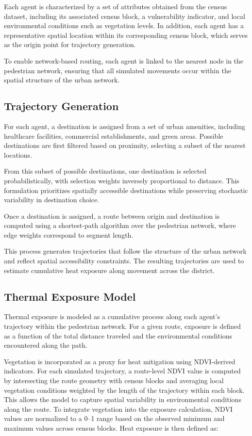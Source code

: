 \documentclass{wscpaperproc}
\theoremstyle{wsc}
\begin{document}
Each agent is characterized by a set of attributes obtained from the census dataset, including its associated census block, a vulnerability indicator, and local environmental conditions such as vegetation levels. In addition, each agent has a representative spatial location within its corresponding census block, which serves as the origin point for trajectory generation.

To enable network-based routing, each agent is linked to the nearest node in the pedestrian network, ensuring that all simulated movements occur within the spatial structure of the urban network.

\subsection{Trajectory Generation}

For each agent, a destination is assigned from a set of urban amenities, including healthcare facilities, commercial establishments, and green areas. Possible destinations are first filtered based on proximity, selecting a subset of the nearest locations.

From this subset of possible destinations, one destination is selected probabilistically, with selection weights inversely proportional to distance. This formulation prioritizes spatially accessible destinations while preserving stochastic variability in destination choice.

Once a destination is assigned, a route between origin and destination is computed using a shortest-path algorithm over the pedestrian network, where edge weights correspond to segment length.

This process generates trajectories that follow the structure of the urban network and reflect spatial accessibility constraints. The resulting trajectories are used to estimate cumulative heat exposure along movement across the district.


\subsection{Thermal Exposure Model}

Thermal exposure is modeled as a cumulative process along each agent's trajectory within the pedestrian network. For a given route, exposure is defined as a function of the total distance traveled and the environmental conditions encountered along the path.

Vegetation is incorporated as a proxy for heat mitigation using NDVI-derived indicators. For each simulated trajectory, a route-level NDVI value is computed by intersecting the route geometry with census blocks and averaging local vegetation conditions weighted by the length of the trajectory within each block. This allows the model to capture spatial variability in environmental conditions along the route. %
To integrate vegetation into the exposure calculation, NDVI values are normalized to a 0--1 range based on the observed minimum and maximum values across census blocks. Heat exposure is then defined as:
\end{document}
